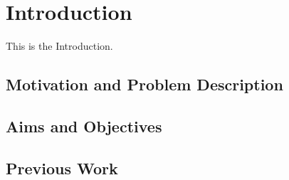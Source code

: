 
\section{Introduction}
\label{sec:introduction}
This is the Introduction.

\subsection{Motivation and Problem Description}
\label{subsec:motivation}

\subsection{Aims and Objectives}
\label{subsec:aims}

\subsection{Previous Work}
\label{subsec:previous_work}
